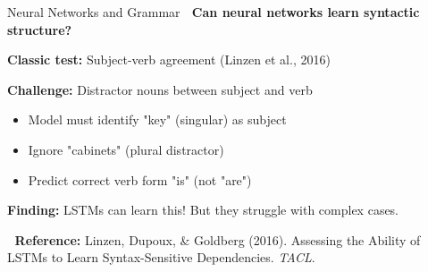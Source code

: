 \documentclass[aspectratio=169]{beamer}
\begin{document}
\begin{frame}{Neural Networks and Grammar 🤖}
    \textbf{Can neural networks learn syntactic structure?}

    \vspace{0.5em}
    \textbf{Classic test:} Subject-verb agreement (Linzen et al., 2016)

    \begin{center}
    \end{center}

    \vspace{0.5em}
    \textbf{Challenge:} Distractor nouns between subject and verb

    \begin{itemize}\setlength{\itemsep}{0pt}
        \item Model must identify "key" (singular) as subject
        \item Ignore "cabinets" (plural distractor)
        \item Predict correct verb form "is" (not "are")
    \end{itemize}

    \vspace{0.5em}
    \textbf{Finding:} LSTMs can learn this! But they struggle with complex cases.

    \vspace{0.3em}
    📖 \textbf{Reference:} Linzen, Dupoux, \& Goldberg (2016). Assessing the Ability of LSTMs to Learn Syntax-Sensitive Dependencies. \textit{TACL}.
\end{frame}
\end{document}
